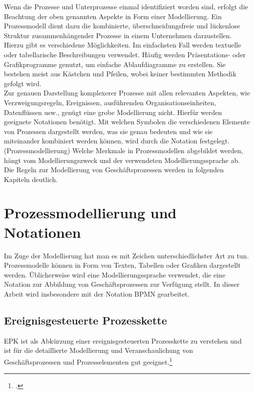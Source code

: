 Wenn die Prozesse und Unterprozesse einmal identifiziert worden sind, 
erfolgt die Beachtung der oben genannten Aspekte in Form einer Modellierung. 
Ein Prozessmodell dient dazu die kombinierte, überschneidungsfreie 
und lückenlose Struktur zusammenhängender Prozesse in einem Unternehmen darzustellen. 
Hierzu gibt es verschiedene Möglichkeiten. 
Im einfachsten Fall werden textuelle oder tabellarische Beschreibungen verwendet. 
Häufig werden Präsentations- oder Grafikprogramme genutzt, um einfache Ablaufdiagramme 
zu erstellen. Sie bestehen meist aus Kästchen und Pfeilen, wobei keiner 
bestimmten Methodik gefolgt wird.\\
Zur genauen Darstellung komplexerer Prozesse mit allen relevanten Aspekten, 
wie Verzweigungsregeln, 
Ereignissen, ausführenden Organisationseinheiten, Datenflüssen usw., 
genügt eine grobe Modellierung nicht. Hierfür werden geeignete Notationen benötigt. 
Mit welchen Symbolen die verschiedenen Elemente von Prozessen dargestellt werden, 
was sie genau bedeuten und wie sie miteinander kombiniert werden können, 
wird durch die Notation festgelegt. (Prozessmodellierung)
Welche Merkmale in Prozessmodellen abgebildet werden, hängt vom 
Modellierungszweck und der verwendeten Modellierungssprache ab. 
Die Regeln zur Modellierung von Geschäftsprozessen werden in folgenden Kapiteln deutlich.

\clearpage
\section{Prozessmodellierung und Notationen}

Im Zuge der Modellierung hat man es mit Zeichen unterschiedlichster Art zu tun.
Prozessmodelle können in Form von Texten, Tabellen oder Grafiken dargestellt werden. 
Üblicherweise wird eine Modellierungssprache verwendet, 
die eine Notation zur Abbildung von Geschäftsprozessen zur Verfügung stellt. 
In dieser Arbeit wird insbesondere mit der Notation BPMN gearbeitet.

\subsection{Ereignisgesteuerte Prozesskette}

EPK ist als Abkürzung einer ereignisgesteuerten Prozesskette zu verstehen und
ist für die detaillierte Modellierung und Veranschaulichung
von Geschäftsprozessen und Prozesselementen gut
geeignet.\footcite[Vgl.][]{lehmann}
 

